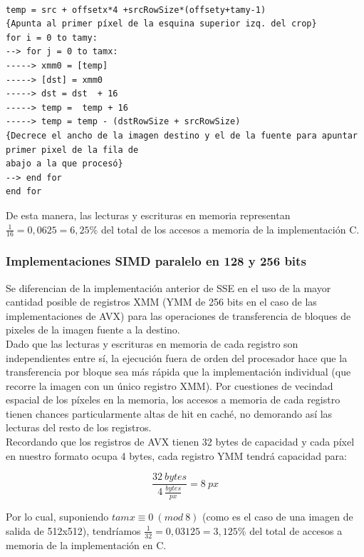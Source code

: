 \begin{codesnippet}
\begin{verbatim}

temp = src + offsetx*4 +srcRowSize*(offsety+tamy-1)       
{Apunta al primer píxel de la esquina superior izq. del crop}
for i = 0 to tamy:  
--> for j = 0 to tamx:  
-----> xmm0 = [temp]
-----> [dst] = xmm0 
-----> dst = dst  + 16 
-----> temp =  temp + 16 
-----> temp = temp - (dstRowSize + srcRowSize)       
{Decrece el ancho de la imagen destino y el de la fuente para apuntar primer pixel de la fila de
abajo a la que procesó}    
--> end for 
end for 

\end{verbatim}
\end{codesnippet}



De esta manera, las lecturas y escrituras en memoria representan $\frac{1}{16} = 0,0625 =  6,25\%$ del total de los accesos a memoria de la implementación C.


\subsubsection{Implementaciones SIMD paralelo en 128 y 256 bits}
Se diferencian de la implementación anterior de SSE en el uso de la mayor cantidad posible de registros XMM (YMM de 256 bits en el caso de las implementaciones de AVX) para las operaciones de transferencia de bloques de pixeles de la imagen fuente a la destino. 
\\

Dado que las lecturas y escrituras en memoria de cada registro son independientes entre sí, la ejecución fuera de orden del procesador hace que la transferencia por bloque sea más rápida que la implementación individual (que recorre la imagen con un único registro XMM). Por cuestiones de vecindad espacial de los píxeles en la memoria, los accesos a memoria de cada registro tienen chances particularmente altas de hit en caché, no demorando así las lecturas del resto de los registros.
\\

Recordando que los registros de AVX tienen 32 bytes de capacidad y cada píxel en nuestro formato ocupa 4 bytes, cada registro YMM tendrá capacidad para:

$$ \frac{32 \ bytes}{4 \ \frac{bytes}{px}} = 8 \ px $$

Por lo cual, suponiendo $ tamx \equiv 0 \ (mod \ 8) $ (como es el caso de una imagen de salida de 512x512), tendríamos $\frac{1}{32} = 0,03125 =  3,125\%$ del total de accesos a memoria de la implementación en C.

